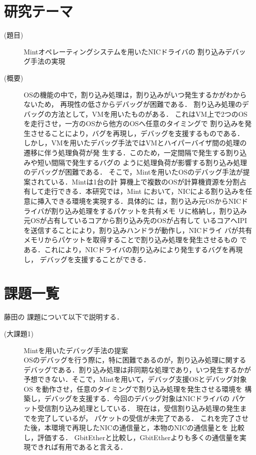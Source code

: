 \documentclass[12pt]{jsarticle}
\begin{document}
\section{研究テーマ}
\begin{description}
    \item[(題目)]Mintオペレーティングシステムを用いたNICドライバの
        割り込みデバッグ手法の実現
    \item[(概要)]
        OSの機能の中で，割り込み処理は，割り込みがいつ発生するかがわからないため，
        再現性の低さからデバッグが困難である．
        割り込み処理のデバッグの方法として，VMを用いたものがある．
        これはVM上で2つのOSを走行させ，一方のOSから他方のOSへ任意のタイミングで
        割り込みを発生させることにより，バグを再現し，デバッグを支援するものである．
        しかし，VMを用いたデバッグ手法ではVMとハイパーバイザ間の処理の遷移に伴う処理負荷が発
        生する．このため，一定間隔で発生する割り込みや短い間隔で発生するバグの
        ように処理負荷が影響する割り込み処理のデバッグが困難である．
        そこで，Mintを用いたOSのデバッグ手法が提案されている．Mintは1台の計
        算機上で複数のOSが計算機資源を分割占有して走行できる．本研究では，Mint
        において，NICによる割り込みを任意に挿入できる環境を実現する．具体的に
        は，割り込み元OSからNICドライバが割り込み処理をするパケットを共有メモ
        リに格納し，割り込み元OSが占有しているコアから割り込み先のOSが占有して
        いるコアへIPIを送信することにより，割り込みハンドラが動作し，NICドライ
        バが共有メモリからパケットを取得することで割り込み処理を発生させるもの
        である．これにより，NICドライバの割り込みにより発生するバグを再現し，
        デバッグを支援することができる．
\end{description}
\section{課題一覧}
藤田の
課題について以下で説明する．
\begin{description}
    \item[(大課題1)]Mintを用いたデバッグ手法の提案\\
        OSのデバッグを行う際に，特に困難であるのが，割り込み処理に関する
        デバッグである．割り込み処理は非同期な処理であり，いつ発生するかが
        予想できない．そこで，Mintを用いて，デバッグ支援OSとデバッグ対象OS
        を動作させ，任意のタイミングで割り込み処理を発生させる環境を
        構築し，デバッグを支援する．今回のデバッグ対象はNICドライバの
        パケット受信割り込み処理としている．
        現在は，受信割り込み処理の発生までを完了しているが，
        パケットの受信が未完了である．
        これを完了させた後，本環境で再現したNICの通信量と，本物のNICの通信量とを
        比較し，評価する．
        GbitEtherと比較し，GbitEtherよりも多くの通信量を実現できれば有用であると言える．
\end{description}
\end{document}
